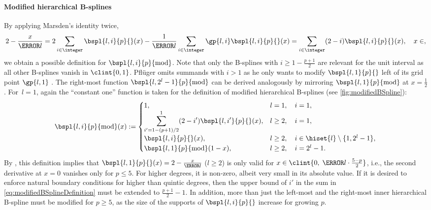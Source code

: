 \paragraph{Modified hierarchical B-splines}

By applying Marsden's identity twice,
\begin{equation}
  \label{eq:modifiedBSplineConstruction}
  2 - \frac{x}{\ms{l}}
  = 2 \sum_{i \in \integer} \bspl{l,i}{p}{}(x)
  - \frac{1}{\ms{l}} \sum_{i \in \integer} \gp{l,i} \bspl{l,i}{p}{}(x)
  = \sum_{i \in \integer} (2 - i) \bspl{l,i}{p}{}(x),\quad
  x \in \real,
\end{equation}
we obtain a possible definition for $\bspl{l,i}{p}{\modified}$.
Note that only the B-splines with $i \ge 1 - \tfrac{p+1}{2}$
are relevant for the unit interval as all other B-splines vanish in $\clint{0, 1}$.
Pflüger omits summands with $i > 1$ as he only wants to modify
$\bspl{l,1}{p}{}$ left of its grid point $\gp{l,1}$ \cite{Pflueger10Spatially}.
The right-most function $\bspl{l,2^l-1}{p}{\modified}$ can be derived
analogously by mirroring $\bspl{l,1}{p}{\modified}$ at $x = \tfrac{1}{2}$.
For~$l = 1$, again the ``constant one'' function is taken for the definition
of modified hierarchical B-splines (see \cref{fig:modifiedBSpline}):
\begin{equation}
  \label{eq:modifiedBSplineDefinition}
  \bspl{l,i}{p}{\modified}(x)
  :=
  \begin{cases}
    1,&
    l = 1,\quad i = 1,\\
    \displaystyle\sum_{i'=1-(p+1)/2}^1 (2 - i') \bspl{l,i'}{p}{}(x),&
    l \ge 2,\quad i = 1,\\
    \bspl{l,i}{p}{}(x),&
    l \ge 2,\quad i \in \hiset{l} \setminus \{1, 2^l - 1\},\\
    \bspl{l,1}{p}{\modified}(1 - x),&
    l \ge 2,\quad i = 2^l - 1.
  \end{cases}
\end{equation}
By ,
this definition implies that
$\bspl{l,1}{p}{}(x) = 2 - \tfrac{x}{\ms{l}}$ ($l \ge 2$)
is only valid for $x \in \clint{0,\; \ms{l} \cdot \tfrac{5-p}{2}}$, i.e.,
the second derivative at $x = 0$ vanishes only for $p \le 5$.
For higher degrees, it is non-zero, albeit very small
in its absolute value.
If it is desired to enforce natural boundary conditions
for higher than quintic degrees,
then the upper bound of $i'$ in the sum in \eqref{eq:modifiedBSplineDefinition}
must be extended to $\tfrac{p+1}{2} - 1$.
In addition, more than just the left-most and the right-most inner
hierarchical B-spline must be modified for $p \ge 5$,
as the size of the supports of $\bspl{l,i}{p}{}$ increase
for growing $p$.

